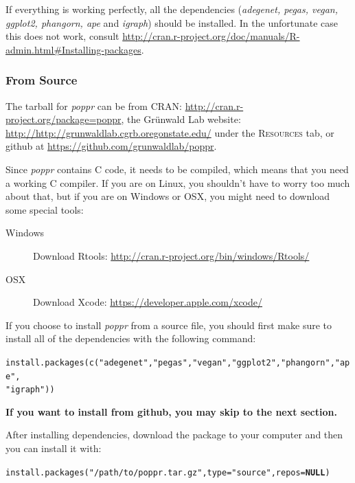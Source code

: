 \documentclass[letterpaper]{article}\usepackage[]{graphicx}\usepackage[]{color}
\makeatletter
\newcommand{\hlstr}[1]{\textcolor[rgb]{0.651,0.522,0}{#1}}%
\newcommand{\hlstd}[1]{\textcolor[rgb]{0,0,0}{#1}}%
\newcommand{\hlkwa}[1]{\textcolor[rgb]{0.733,0.475,0.467}{\textbf{#1}}}%
\newcommand{\hlkwc}[1]{\textcolor[rgb]{0,0.502,0.753}{#1}}%
\newcommand{\hlkwd}[1]{\textcolor[rgb]{0,0.267,0.4}{#1}}%
\newenvironment{kframe}{%
 \def\at@end@of@kframe{}%
 \ifinner\ifhmode%
  \def\at@end@of@kframe{\end{minipage}}%
  \begin{minipage}{\columnwidth}%
 \fi\fi%
 \def\FrameCommand##1{\hskip\@totalleftmargin \hskip-\fboxsep
 \colorbox{shadecolor}{##1}\hskip-\fboxsep
     \hskip-\linewidth \hskip-\@totalleftmargin \hskip\columnwidth}%
 \MakeFramed {\advance\hsize-\width
   \@totalleftmargin\z@ \linewidth\hsize
   \@setminipage}}%
 {\par\unskip\endMakeFramed%
 \at@end@of@kframe}
\newenvironment{knitrout}{}{} %
\newcommand{\tab}{\hspace*{1em}}
\makeatother
\begin{document}
If everything is working perfectly, all the dependencies (\textit{adegenet, pegas, vegan, ggplot2, phangorn, ape} and \textit{igraph}) should be installed. In the unfortunate case this does not work, consult \url{http://cran.r-project.org/doc/manuals/R-admin.html#Installing-packages}.

\subsubsection{From Source}
\tab\tab The tarball for \textit{poppr} can be from CRAN: \url{http://cran.r-project.org/package=poppr}, the Gr\"unwald Lab website: \url{http://http://grunwaldlab.cgrb.oregonstate.edu/} under the \textsc{Resources} tab, or github at \url{https://github.com/grunwaldlab/poppr}. 

Since \textit{poppr} contains C code, it needs to be compiled, which means that you need a working C compiler. If you are on Linux, you shouldn't have to worry too much about that, but if you are on Windows or OSX, you might need to download some special tools:

\begin{description}
  \item[Windows] Download Rtools: \url{http://cran.r-project.org/bin/windows/Rtools/}
  \item[OSX] Download Xcode: \url{https://developer.apple.com/xcode/}
\end{description}

If you choose to install \textit{poppr} from a source file, you should first make sure to install all of the dependencies with the following command:
\begin{knitrout}\footnotesize
{}\color{fgcolor}\begin{kframe}
\begin{alltt}
\hlkwd{install.packages}\hlstd{(}\hlkwd{c}\hlstd{(}\hlstr{"adegenet"}\hlstd{,} \hlstr{"pegas"}\hlstd{,} \hlstr{"vegan"}\hlstd{,} \hlstr{"ggplot2"}\hlstd{,} \hlstr{"phangorn"}\hlstd{,} \hlstr{"ape"}\hlstd{,}
    \hlstr{"igraph"}\hlstd{))}
\end{alltt}
\end{kframe}
\end{knitrout}

\textbf{If you want to install from github, you may skip to the next section.}

After installing dependencies, download the package to your computer and then you can install it with:
\begin{knitrout}\footnotesize
{}\color{fgcolor}\begin{kframe}
\begin{alltt}
\hlkwd{install.packages}\hlstd{(}\hlstr{"/path/to/poppr.tar.gz"}\hlstd{,} \hlkwc{type} \hlstd{=} \hlstr{"source"}\hlstd{,} \hlkwc{repos} \hlstd{=} \hlkwa{NULL}\hlstd{)}
\end{alltt}
\end{kframe}
\end{knitrout}
\end{document}
